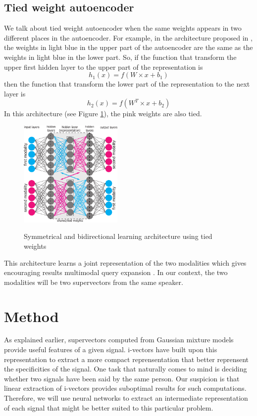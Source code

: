 \documentclass[conference]{IEEEtran}
\begin{document}
\subsection{Tied weight autoencoder}


We talk about tied weight autoencoder when the same weights appears in two
different places in the autoencoder. For example, in the architecture proposed
in \cite{vukotic:hal-01314302}, the weights in light blue in the upper part of the
autoencoder are the same as the weights in light blue in the lower part. So, if
the function that transform the upper first hidden layer to the upper part of
the representation is
\begin{equation}
 h_1(x) = f(W \times x + b_1) 
\end{equation}
then  the function that transform the lower part of the representation to the
next layer is
\begin{equation}
 h_2(x) = f(W^T \times x + b_2) 
\end{equation}
In this architecture (see Figure \ref{archi_vedran}), the pink weights are also tied. 

\begin{figure}[!h]
    \centering
    \caption{Symmetrical and bidirectional learning architecture using tied weights}
    \includegraphics[width=5cm]{archi-vedran.pdf}
    \label{archi_vedran}
\end{figure}

This architecture learns a joint representation of the two modalities which gives encouraging results multimodal query expansion \cite{vukotic:hal-01314302}. In our context, the two modalities will be two supervectors from the same speaker.

\section{Method}
\label{sec:Method}

As explained earlier, supervectors computed from Gaussian mixture models provide
useful features of a given signal. i-vectors have built upon this representation
to extract a more compact reprensentation that better reprensent the
specificities of the signal.
One task that naturally comes to mind is deciding whether two signals have been
said by the same person. Our suspicion is that linear extraction of i-vectors
provides suboptimal results for such computations.
Therefore, we will use neural networks to extract an intermediate representation
of each signal that might be better suited to this particular problem.
\end{document}
